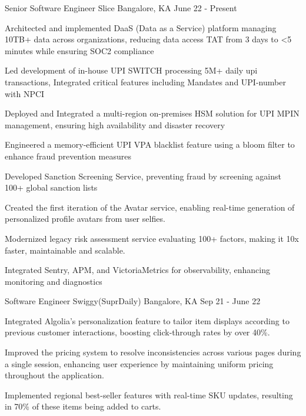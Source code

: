 \begin{cventries}
  \cventry
    {Senior Software Engineer}
    {Slice}
    {Bangalore, KA}
    {June 22 - Present}
    {
      \begin{cvitems}
        \item {Architected and implemented DaaS (Data as a Service) platform managing 10TB+ data across organizations, reducing data access TAT from 3 days to <5 minutes while ensuring SOC2 compliance}
        \item {Led development of in-house UPI SWITCH processing 5M+ daily upi transactions, Integrated critical features including Mandates and UPI-number with NPCI}
        \item {Deployed and Integrated a multi-region on-premises HSM solution for UPI MPIN management, ensuring high availability and disaster recovery}
        \item {Engineered a memory-efficient UPI VPA blacklist feature using a bloom filter to enhance fraud prevention measures}
        \item {Developed Sanction Screening Service, preventing fraud by screening against 100+ global sanction lists}
        \item {Created the first iteration of the Avatar service, enabling real-time generation of personalized profile avatars from user selfies.}
        \item {Modernized legacy risk assessment service evaluating 100+ factors, making it 10x faster, maintainable and scalable.}
        \item {Integrated Sentry, APM, and VictoriaMetrics for observability, enhancing monitoring and diagnostics}
      \end{cvitems}
    }
  
  \cventry
    {Software Engineer}
    {Swiggy(SuprDaily)}
    {Bangalore, KA}
    {Sep 21 - June 22}
    {
      \begin{cvitems}
        \item {Integrated Algolia's personalization feature to tailor item displays according to previous customer interactions, boosting click-through rates by over 40\%.}
        \item {Improved the pricing system to resolve inconsistencies across various pages during a single session, enhancing user experience by maintaining uniform pricing throughout the application.}
        \item {Implemented regional best-seller features with real-time SKU updates, resulting in 70\% of these items being added to carts.}
      \end{cvitems}
    }
  

\end{cventries}
